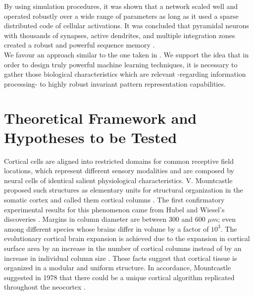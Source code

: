 \documentclass[11pt,a4paper]{article}
\begin{document}
By using simulation procedures, it was shown that a network
scaled well and operated robustly over a wide range of parameters as long as it
used a sparse distributed code of cellular activations.
It was concluded that pyramidal neurons with thousands of
synapses, active dendrites, and multiple integration zones
created a robust and powerful
sequence memory \cite{hawkins_2016}. \\

We favour an approach similar to the one taken in \cite{hawkins_2016}.
We support the idea that in order to design truly powerful machine
learning techniques,
it is necessary to gather those biological characteristics which are
relevant -regarding information processing- to highly
robust invariant pattern representation capabilities. \\













\section{Theoretical Framework and Hypotheses to be Tested}

Cortical cells are aligned into restricted domains for common receptive field locations,
which represent different sensory modalities and are composed by neural cells of identical
salient physiological characteristics.
V. Mountcastle proposed such structures as elementary units for structural organization
in the somatic cortex and called them cortical columns \cite{mountcastle_1955, mountcastle_1957}.
The first confirmatory experimental results for this phenomenon came from Hubel and Wiesel’s
discoveries \cite{hubel_1962, hubel_1968}.
Margins in column diameter are between 300 and 600 $\mu m$; even
among different species whose brains differ in volume by a factor of $10^3$.
The evolutionary cortical brain expansion is achieved due to the expansion in
cortical surface area by an increase in the number of cortical columns
instead of by an increase in individual column size \cite{rakic_1995}.
These facts suggest that cortical tissue is organized in a modular and uniform structure.
In accordance, Mountcastle suggested in 1978 that there could be
a unique cortical algorithm replicated throughout the neocortex
\cite{mountcastle_1978}.\\
\end{document}
